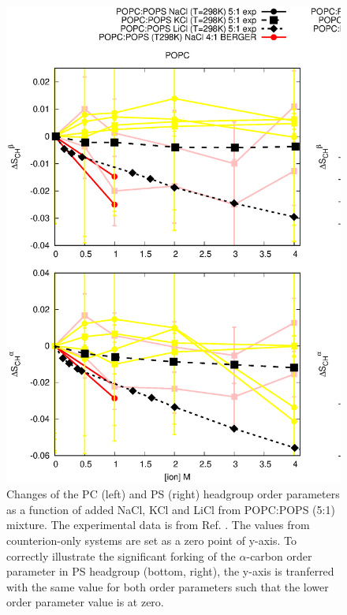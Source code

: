 \documentclass[aps,prl,superscriptaddress,twocolumn]{revtex4}
\begin{document}
\begin{figure}[]
  \centering
  \includegraphics[width=18.0cm]{../Figs/CHANGESwithMONVALENTwithPS.eps}
  \caption{\label{PSresponseTONaCl}
    Changes of the PC (left) and PS (right) headgroup order parameters as a function of
    added NaCl, KCl and LiCl from POPC:POPS (5:1) mixture. The experimental data is from Ref. .
    The values from counterion-only systems are set as a zero point of y-axis.
    To correctly illustrate the significant forking of the $\alpha$-carbon order parameter
    in PS headgroup (bottom, right), the y-axis is tranferred with the same value for both order parameters such that the lower order
    parameter value is at zero.
  }
\end{figure}
\end{document}
